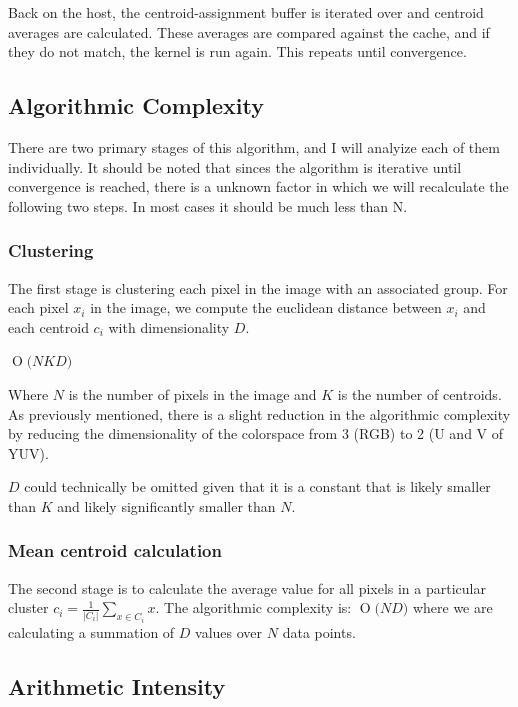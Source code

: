 \documentclass[11pt]{article}
\newcommand{\BigO}[1]{\ensuremath{\operatorname{O}\bigl(#1\bigr)}}
\begin{document}
Back on the host, the centroid-assignment buffer is iterated over and centroid
averages are calculated. These averages are compared against the cache, and if they
do not match, the kernel is run again. This repeats until convergence.

\subsection{Algorithmic Complexity}

There are two primary stages of this algorithm, and I will analyize each of them individually.
It should be noted that sinces the algorithm is iterative until convergence is reached, there
is a unknown factor in which we will recalculate the following two steps. In most cases it
should be much less than N.

\subsubsection{Clustering}

The first stage is clustering each pixel in the image with an associated group. For
each pixel $x_i$ in the image, we compute the euclidean distance between $x_i$
and each centroid $c_i$ with dimensionality $D$.

$\BigO{NKD}$

Where $N$ is the number of pixels in the image and $K$ is the number of centroids. As
previously mentioned, there is a slight reduction in the algorithmic complexity by
reducing the dimensionality of the colorspace from 3 (RGB) to 2 (U and V of YUV).

$D$ could technically be omitted given that it is a constant that is likely smaller
than $K$ and likely significantly smaller than $N$.

\subsubsection{Mean centroid calculation}

The second stage is to calculate the average value for all pixels in a particular
cluster $c_i = \frac{1}{|C_i|}\sum_{x \in C_i}x$. The algorithmic complexity is: $\BigO{ND}$
where we are calculating a summation of $D$ values over $N$ data points.

\subsection{Arithmetic Intensity}
\end{document}
